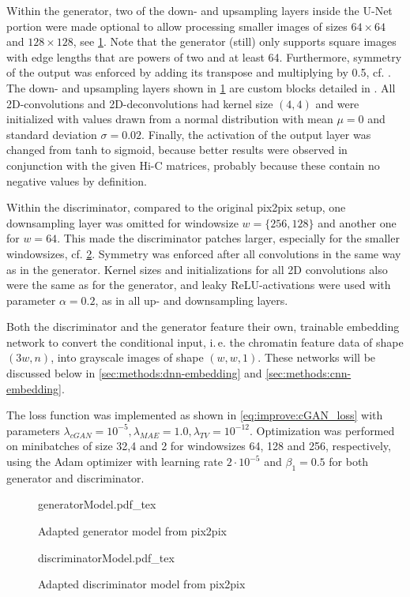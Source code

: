 Within the generator, two of the down- and upsampling layers inside the U-Net portion were made optional 
to allow processing smaller images of sizes $64\times64$ and $128\times128$, see \cref{fig:methods:GAN_arch:generator}.
Note that the generator (still) only supports square images with edge lengths that are powers of two and at least 64.
Furthermore, symmetry of the output was enforced by adding its transpose and multiplying by 0.5, cf. \cite{Fudenberg2020}.
The down- and upsampling layers shown in  \cref{fig:methods:GAN_arch:generator} are custom blocks 
detailed in \xxx. 
All 2D-convolutions and 2D-deconvolutions had kernel size $(4,4)$ and were initialized with values drawn from a normal distribution with mean $\mu=0$ and
standard deviation $\sigma=0.02$.
Finally, the activation of the output layer was changed from tanh to sigmoid, because better results were observed
in conjunction with the given Hi-C matrices, probably because these contain no negative values by definition.

Within the discriminator, compared to the original pix2pix setup, 
one downsampling layer was omitted for windowsize $w=\{256,128\}$ and another one for $w=64$.
This made the discriminator patches larger, especially for the smaller windowsizes,
cf. \cref{fig:methods:GAN_arch:discriminator}.
Symmetry was enforced after all convolutions in the same way as in the generator.
Kernel sizes and initializations for all 2D convolutions also were the same as for the generator,
and leaky ReLU-activations were used with parameter $\alpha=0.2$, as in all up- and downsampling layers.

Both the discriminator and the generator feature their own, trainable embedding network
to convert the conditional input, i.\,e. the chromatin feature data of shape $(3w, n)$,
into grayscale images of shape $(w,w,1)$. 
These networks will be discussed below in \cref{sec:methods:dnn-embedding}
and \cref{sec:methods:cnn-embedding}.

The loss function was implemented as shown in \ref{eq:improve:cGAN_loss}
with parameters $\lambda_\mathit{cGAN}=10^{-5}, \lambda_\mathit{MAE}=1.0, \lambda_\mathit{TV}=10^{-12}$.
Optimization was performed on minibatches of size 32,4 and 2 for windowsizes 64, 128 and 256, respectively, 
using the Adam optimizer with learning rate $2\cdot10^{-5}$ and $\beta_1=0.5$ for both generator and discriminator.

\begin{figure}[p]
    \tiny
    {generatorModel.pdf_tex}
    \caption{Adapted generator model from pix2pix} \label{fig:methods:GAN_arch:generator}
\end{figure}
\begin{figure}[p]
    \scriptsize
    \centering
    {discriminatorModel.pdf_tex}
    \caption{Adapted discriminator model from pix2pix} \label{fig:methods:GAN_arch:discriminator}
\end{figure}

